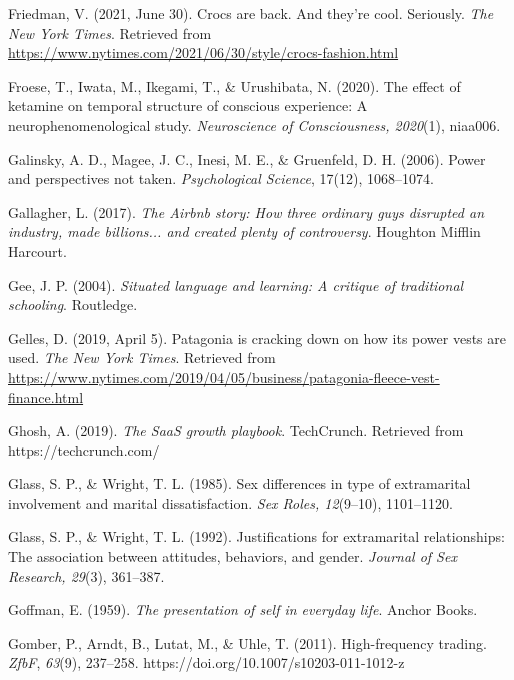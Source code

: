 \begin{thebibliography}{}
    Friedman, V. (2021, June 30). Crocs are back. And they’re cool. Seriously. \textit{The New York Times}. Retrieved from \url{https://www.nytimes.com/2021/06/30/style/crocs-fashion.html}


    Froese, T., Iwata, M., Ikegami, T., \& Urushibata, N. (2020). The effect of ketamine on temporal structure of conscious experience: A neurophenomenological study. \textit{Neuroscience of Consciousness, 2020}(1), niaa006.

    
    Galinsky, A. D., Magee, J. C., Inesi, M. E., \& Gruenfeld, D. H. (2006). Power and perspectives not taken. \textit{Psychological Science}, 17(12), 1068–1074.

    Gallagher, L. (2017). \textit{The Airbnb story: How three ordinary guys disrupted an industry, made billions... and created plenty of controversy}. Houghton Mifflin Harcourt.
    
    Gee, J. P. (2004). \textit{Situated language and learning: A critique of traditional schooling}. Routledge.

    Gelles, D. (2019, April 5). Patagonia is cracking down on how its power vests are used. \textit{The New York Times}. Retrieved from \url{https://www.nytimes.com/2019/04/05/business/patagonia-fleece-vest-finance.html}

    Ghosh, A. (2019). \textit{The SaaS growth playbook}. TechCrunch. Retrieved from https://techcrunch.com/
    
    Glass, S. P., \& Wright, T. L. (1985). Sex differences in type of extramarital involvement and marital dissatisfaction. \textit{Sex Roles, 12}(9–10), 1101–1120.
    
    Glass, S. P., \& Wright, T. L. (1992). Justifications for extramarital relationships: The association between attitudes, behaviors, and gender. \textit{Journal of Sex Research, 29}(3), 361–387.
    
    Goffman, E. (1959). \textit{The presentation of self in everyday life}. Anchor Books.

    Gomber, P., Arndt, B., Lutat, M., \& Uhle, T. (2011). High-frequency trading. \textit{ZfbF}, \textit{63}(9), 237–258. https://doi.org/10.1007/s10203-011-1012-z


\end{thebibliography}
